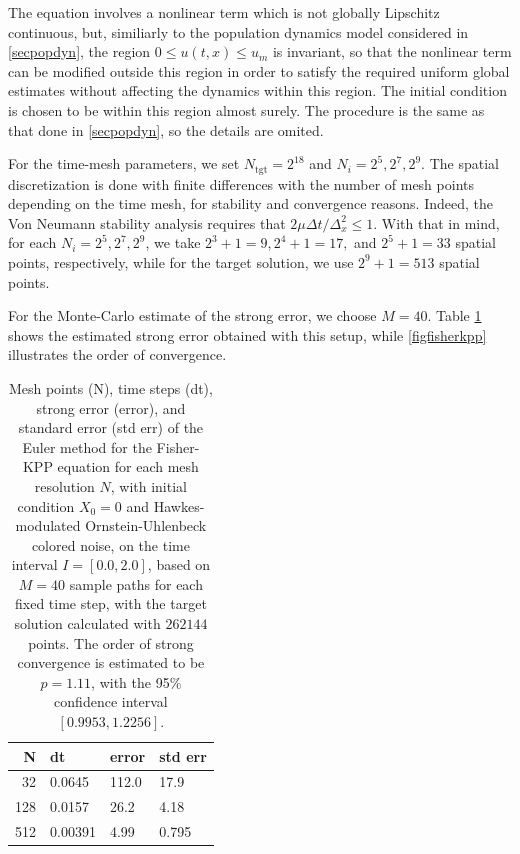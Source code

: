 \documentclass[reqno,12pt]{amsart}
\theoremstyle{plain} %
\theoremstyle{definition} %
\begin{document}
The equation involves a nonlinear term which is not globally Lipschitz continuous, but, similiarly to the population dynamics model considered in \cref{secpopdyn}, the region $0 \leq u(t, x) \leq u_m$ is invariant, so that the nonlinear term can be modified outside this region in order to satisfy the required uniform global estimates without affecting the dynamics within this region. The initial condition is chosen to be within this region almost surely. The procedure is the same as that done in \cref{secpopdyn}, so the details are omited.

For the time-mesh parameters, we set $N_{\textrm{tgt}} = 2^{18}$ and $N_i = 2^5, 2^7, 2^9$. The spatial discretization is done with finite differences with the number of mesh points depending on the time mesh, for stability and convergence reasons. Indeed, the Von Neumann stability analysis requires that $2\mu\Delta t / \Delta_x^2 \leq 1.$ With that in mind, for each $N_i = 2^5, 2^7, 2^9$, we take $2^3 + 1 = 9, 2^4 + 1 = 17,$ and $2^5 + 1 = 33$ spatial points, respectively, while for the target solution, we use $2^9 + 1 = 513$ spatial points.

For the Monte-Carlo estimate of the strong error, we choose $M = 40.$ Table \ref{tablefisherkpp} shows the estimated strong error obtained with this setup, while \cref{figfisherkpp} illustrates the order of convergence.

\begin{table}
    \begin{tabular}[htb]{|r|l|l|l|}
        \hline N & dt & error & std err \\
        \hline \hline
        32 & 0.0645 & 112.0 & 17.9 \\
        128 & 0.0157 & 26.2 & 4.18 \\
        512 & 0.00391 & 4.99 & 0.795 \\
        \hline
    \end{tabular}
    \bigskip

    \caption{Mesh points (N), time steps (dt), strong error (error), and standard error (std err) of the Euler method for the Fisher-KPP equation for each mesh resolution $N$, with initial condition $X_0 = 0$ and Hawkes-modulated Ornstein-Uhlenbeck colored noise, on the time interval $I = [0.0, 2.0]$, based on $M = 40$ sample paths for each fixed time step, with the target solution calculated with $262144$ points. The order of strong convergence is estimated to be $p = 1.11$, with the 95\% confidence interval $[0.9953, 1.2256]$.}
    \label{tablefisherkpp}
\end{table}
\end{document}
